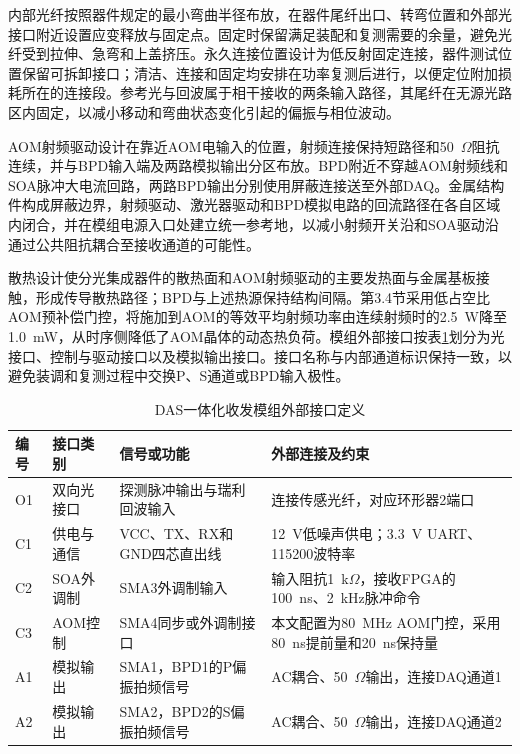 内部光纤按照器件规定的最小弯曲半径布放，在器件尾纤出口、转弯位置和外部光接口附近设置应变释放与固定点。固定时保留满足装配和复测需要的余量，避免光纤受到拉伸、急弯和上盖挤压。永久连接位置设计为低反射固定连接，器件测试位置保留可拆卸接口；清洁、连接和固定均安排在功率复测后进行，以便定位附加损耗所在的连接段。参考光与回波属于相干接收的两条输入路径，其尾纤在无源光路区内固定，以减小移动和弯曲状态变化引起的偏振与相位波动。

AOM射频驱动设计在靠近AOM电输入的位置，射频连接保持短路径和50~$\Omega$阻抗连续，并与BPD输入端及两路模拟输出分区布放。BPD附近不穿越AOM射频线和SOA脉冲大电流回路，两路BPD输出分别使用屏蔽连接送至外部DAQ。金属结构件构成屏蔽边界，射频驱动、激光器驱动和BPD模拟电路的回流路径在各自区域内闭合，并在模组电源入口处建立统一参考地，以减小射频开关沿和SOA驱动沿通过公共阻抗耦合至接收通道的可能性。

散热设计使分光集成器件的散热面和AOM射频驱动的主要发热面与金属基板接触，形成传导散热路径；BPD与上述热源保持结构间隔。第3.4节采用低占空比AOM预补偿门控，将施加到AOM的等效平均射频功率由连续射频时的2.5~W降至1.0~mW，从时序侧降低了AOM晶体的动态热负荷。模组外部接口按表\ref{tab:chap3_module_interfaces}划分为光接口、控制与驱动接口以及模拟输出接口。接口名称与内部通道标识保持一致，以避免装调和复测过程中交换P、S通道或BPD输入极性。

\begin{table}[htbp]
  \centering
  \caption{DAS一体化收发模组外部接口定义}
  \label{tab:chap3_module_interfaces}
  \renewcommand{\arraystretch}{1.2}
  \small
  \begin{tabular}{p{}p{}p{}p{}}
    \toprule
    编号 & 接口类别 & 信号或功能 & 外部连接及约束 \\
    \midrule
    O1 & 双向光接口 & 探测脉冲输出与瑞利回波输入 & 连接传感光纤，对应环形器2端口 \\
    C1 & 供电与通信 & VCC、TX、RX和GND四芯直出线 & 12~V低噪声供电；3.3~V UART、115200波特率 \\
    C2 & SOA外调制 & SMA3外调制输入 & 输入阻抗1~k$\Omega$，接收FPGA的100~ns、2~kHz脉冲命令 \\
    C3 & AOM控制 & SMA4同步或外调制接口 & 本文配置为80~MHz AOM门控，采用80~ns提前量和20~ns保持量 \\
    A1 & 模拟输出 & SMA1，BPD1的P偏振拍频信号 & AC耦合、50~$\Omega$输出，连接DAQ通道1 \\
    A2 & 模拟输出 & SMA2，BPD2的S偏振拍频信号 & AC耦合、50~$\Omega$输出，连接DAQ通道2 \\
    \bottomrule
  \end{tabular}
\end{table}

